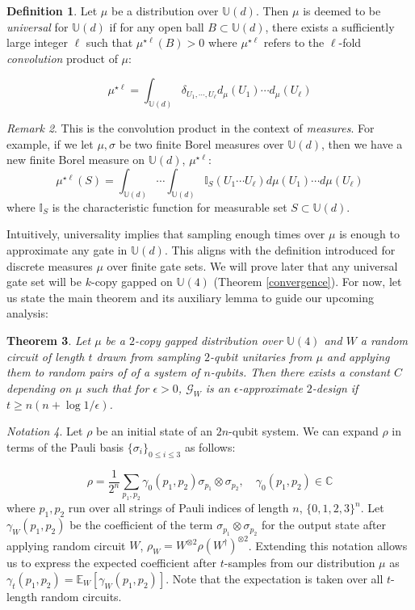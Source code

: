 \documentclass[12pt]{amsart}
\newtheorem{theorem}{Theorem}[section]
\theoremstyle{definition}
\newtheorem{definition}[theorem]{Definition}
\theoremstyle{remark}
\newtheorem{remark}[theorem]{Remark}
\numberwithin{equation}{section}
\theoremstyle{remark}
\newtheorem{notation}[theorem]{Notation}
\begin{document}
%
\begin{definition} \label{univdef}
  Let $\mu$ be a distribution over $\mathbb{U}(d)$. Then $\mu$ is deemed to be \emph{universal} for $\mathbb{U}(d)$ if for any open ball $B \subset \mathbb{U}(d)$, there exists a sufficiently large integer $\ell$ such that $\mu^{\star \ell}(B) > 0$
  where $\mu^{\star \ell}$ refers to the $\ell$-fold \emph{convolution} product of $\mu$:
\end{definition}
%
\begin{equation}
\mu^{\star \ell} = \int_{\mathbb{U}(d)} \delta_{U_1,\cdots, U_\ell} d_\mu(U_1)\cdots d_\mu(U_\ell)
\end{equation}
%
\begin{remark}
  This is the convolution product in the context of \emph{measures}. For example, if we let $\mu,\sigma$ be two finite Borel measures over $\mathbb{U}(d)$, then we have a new finite Borel measure on $\mathbb{U}(d)$, $\mu^{\star \ell}$:
  $$ \mu^{\star \ell} (S) = \int_{\mathbb{U}(d)}\cdots\int_{\mathbb{U}(d)} \mathbb{I}_S(U_1\cdots U_{\ell}) d\mu(U_1) \cdots d\mu(U_\ell) $$
  where $\mathbb{I}_S$ is the characteristic function for measurable set $S \subset \mathbb{U}(d)$.
\end{remark}
%
\noindent Intuitively, universality implies that sampling enough times over $\mu$ is enough to approximate any gate in $\mathbb{U}(d)$. This aligns with the definition introduced for discrete measures $\mu$ over finite gate sets. We will prove later that any universal gate set will be $k$-copy gapped on $\mathbb{U}(4)$ (Theorem  \ref{convergence}). For now, let us state the main theorem and its auxiliary lemma to guide our upcoming analysis:
%
\begin{theorem} \label{maintheorem}
  Let $\mu$ be a $2$-copy gapped distribution over $\mathbb{U}(4)$ and $W$ a random circuit of length $t$ drawn from sampling $2$-qubit unitaries from $\mu$ and applying them to random pairs of of a system of $n$-qubits. Then there exists a constant $C$ depending on $\mu$ such that for $\epsilon > 0$, $\mathcal{G}_W$ is an $\epsilon$-approximate $2$-design if $t \geq n(n + \log 1/\epsilon)$.
\end{theorem}
%
\begin{notation}
  Let $\rho$ be an initial state of an $2n$-qubit system. We can expand $\rho$ in terms of the Pauli basis $\{\sigma_i\}_{0 \leq i \leq 3}$ as follows:

  \begin{equation}
    \rho = \frac{1}{2^n} \sum_{p_1,p_2} \gamma_0(p_1,p_2) \sigma_{p_1} \otimes \sigma_{p_2}, \quad \gamma_0(p_1,p_2) \in \mathbb{C}
   \end{equation}
  where $p_1,p_2$ run over all strings of Pauli indices of length $n$, $\{0,1,2,3\}^n$. Let $\gamma_W(p_1,p_2)$ be the coefficient of the term $\sigma_{p_1} \otimes \sigma_{p_2}$ for the output state after applying random circuit $W$, $\rho_W = W^{\otimes 2} \rho (W^\dagger)^{\otimes 2}$. Extending this notation allows us to express the expected coefficient after $t$-samples from our distribution $\mu$ as
  $\gamma_t(p_1,p_2) = \mathbb{E}_W [\gamma_W(p_1,p_2)]$. Note that the expectation is taken over all $t$-length random circuits.
\end{notation}
\end{document}
